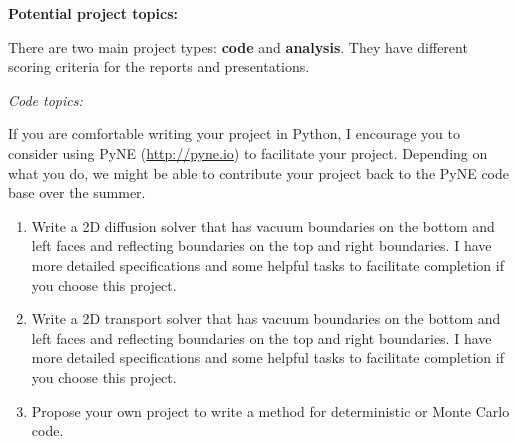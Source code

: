 \documentclass[12pt]{article}
\begin{document}
\clearpage 
\begin{center}
\textbf{Potential project topics:}
\end{center}
There are two main project types: \textbf{code} and \textbf{analysis}. They have different scoring criteria for the reports and presentations.

\begin{center}
\textit{Code topics:}
\end{center}
If you are comfortable writing your project in Python, I encourage you to consider using PyNE (\href{http://pyne.io}{http://pyne.io}) to facilitate your project. Depending on what you do, we might be able to contribute your project back to the PyNE code base over the summer.

\begin{enumerate}
\item Write a 2D diffusion solver that has vacuum boundaries on the bottom and left faces and reflecting boundaries on the top and right boundaries. I have more detailed specifications and some helpful tasks to facilitate completion if you choose this project. 

\item Write a 2D transport solver that has vacuum boundaries on the bottom and left faces and reflecting boundaries on the top and right boundaries. I have more detailed specifications and some helpful tasks to facilitate completion if you choose this project. 



\item Propose your own project to write a method for deterministic or Monte Carlo code. 
\end{enumerate}
\end{document}
